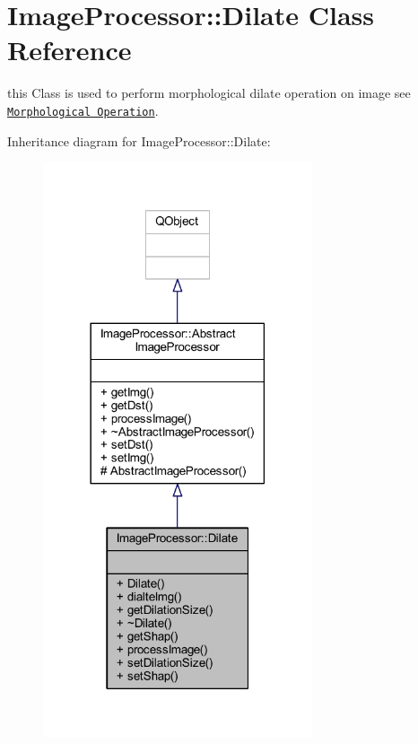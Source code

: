 \hypertarget{class_image_processor_1_1_dilate}{}\section{Image\+Processor\+:\+:Dilate Class Reference}
\label{class_image_processor_1_1_dilate}


this Class is used to perform morphological dilate operation on image see \href{https://docs.opencv.org/trunk/d9/d61/tutorial_py_morphological_ops.html}{\tt Morphological Operation}.  




Inheritance diagram for Image\+Processor\+:\+:Dilate\+:\nopagebreak
\begin{figure}[H]
\begin{center}
\leavevmode
\includegraphics[width=225pt]{dd/d84/class_image_processor_1_1_dilate__inherit__graph}
\end{center}
\end{figure}


